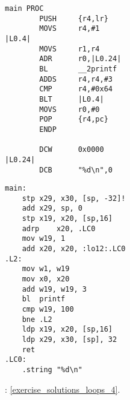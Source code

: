 \begin{lstlisting}[caption=\NonOptimizingKeilVI (\ThumbMode)]
main PROC
        PUSH     {r4,lr}
        MOVS     r4,#1
|L0.4|
        MOVS     r1,r4
        ADR      r0,|L0.24|
        BL       __2printf
        ADDS     r4,r4,#3
        CMP      r4,#0x64
        BLT      |L0.4|
        MOVS     r0,#0
        POP      {r4,pc}
        ENDP

        DCW      0x0000
|L0.24|
        DCB      "%d\n",0
\end{lstlisting}

\begin{lstlisting}[caption=\Optimizing GCC 4.9 (ARM64)]
main:
	stp	x29, x30, [sp, -32]!
	add	x29, sp, 0
	stp	x19, x20, [sp,16]
	adrp	x20, .LC0
	mov	w19, 1
	add	x20, x20, :lo12:.LC0
.L2:
	mov	w1, w19
	mov	x0, x20
	add	w19, w19, 3
	bl	printf
	cmp	w19, 100
	bne	.L2
	ldp	x19, x20, [sp,16]
	ldp	x29, x30, [sp], 32
	ret
.LC0:
	.string	"%d\n"
\end{lstlisting}



: \ref{exercise_solutions_loops_4}.